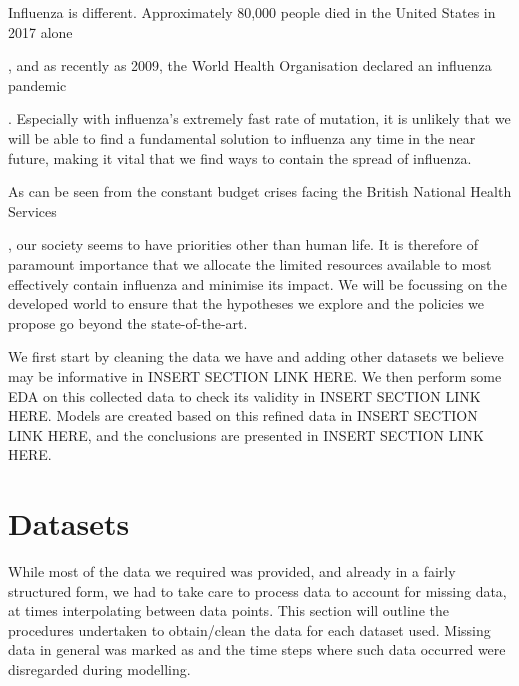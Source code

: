\documentclass[letterpaper,10pt,english]{sphinxmanual}
\begin{document}
Influenza is different. Approximately 80,000 people died in the United States in 2017 alone %
\begin{footnote}[4]\sphinxAtStartFootnote
{}
%
\end{footnote}, and as recently as 2009, the World Health Organisation declared an influenza pandemic %
\begin{footnote}[5]\sphinxAtStartFootnote
{}
%
\end{footnote}. Especially with  influenza’s extremely fast rate of mutation, it is unlikely that we will be able to find a fundamental solution to influenza any time in the near future, making it vital that we find ways to contain the spread of influenza.

As can be seen from the constant budget crises facing the British National Health Services %
\begin{footnote}[6]\sphinxAtStartFootnote
{}
%
\end{footnote}, our society seems to have priorities other than human life. It is therefore of paramount importance that we allocate the limited resources available to most effectively contain influenza and minimise its impact. We will be focussing on the developed world to ensure that the hypotheses we explore and the policies we propose go beyond the state-of-the-art.

We first start by cleaning the data we have and adding other datasets we believe may be informative in INSERT SECTION LINK HERE. We then perform some EDA on this collected data to check its validity in INSERT SECTION LINK HERE. Models are created based on this refined data in INSERT SECTION LINK HERE, and the conclusions are presented in INSERT SECTION LINK HERE.


\section{Datasets}
\label{\detokenize{datasets:datasets}}\label{\detokenize{datasets:id1}}\label{\detokenize{datasets::doc}}
While most of the data we required was provided, and already in a fairly structured form, we had to take care to process data to account for missing data, at times interpolating between data points. This section will outline the procedures undertaken to obtain/clean the data for each dataset used. Missing data in general was marked as  and the time steps where such data occurred were disregarded during modelling.
\end{document}
